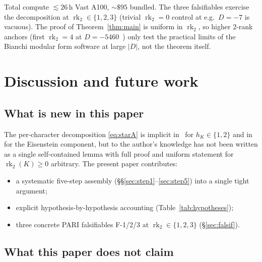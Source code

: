 \documentclass[11pt,a4paper,reqno]{amsart}
\theoremstyle{definition}
\DeclareMathOperator{\rk}{rk}
\begin{document}
Total compute $\lesssim 26$\,h Vast A100, $\sim\$95$ bundled. The three falsifiables exercise the decomposition at $\rk_2\in\{1,2,3\}$ (trivial $\rk_2=0$ control at e.g.~$D=-7$ is vacuous). The proof of Theorem~\ref{thm:main} is uniform in $\rk_2$, so higher 2-rank anchors (first $\rk_2=4$ at $D=-5460$~\cite{Remondiere2026Faltings}) only test the practical limits of the Bianchi modular form software at large $|D|$, not the theorem itself.

\section{Discussion and future work}\label{sec:open}

\subsection{What is new in this paper}\label{ss:new}

The per-character decomposition \eqref{eq:starA} is implicit in~\cite[\S\S3--4]{Sarnak1983} for $h_K\in\{1,2\}$ and in~\cite[\S7.7]{ElstrodtGrunewaldMennicke1998} for the Eisenstein component, but to the author's knowledge has not been written as a single self-contained lemma with full proof and uniform statement for $\rk_2(K)\geq 0$ arbitrary. The present paper contributes:
\begin{itemize}[leftmargin=2em]
  \item a systematic five-step assembly (\S\S\ref{sec:step1}--\ref{sec:step5}) into a single tight argument;
  \item explicit hypothesis-by-hypothesis accounting (Table~\ref{tab:hypotheses});
  \item three concrete PARI falsifiables F-1/2/3 at $\rk_2\in\{1,2,3\}$ (\S\ref{sec:falsif}).
\end{itemize}

\subsection{What this paper does not claim}\label{ss:notclaim}
\end{document}
